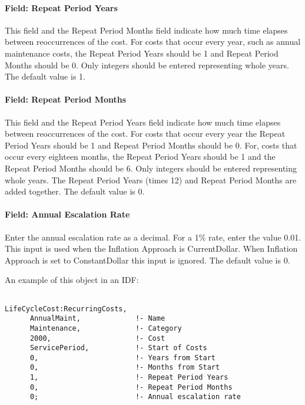 \paragraph{Field: Repeat Period Years}\label{field-repeat-period-years}

This field and the Repeat Period Months field indicate how much time elapses between reoccurrences of the cost. For costs that occur every year, such as annual maintenance costs, the Repeat Period Years should be 1 and Repeat Period Months should be 0. Only integers should be entered representing whole years. The default value is 1.

\paragraph{Field: Repeat Period Months}\label{field-repeat-period-months}

This field and the Repeat Period Years field indicate how much time elapses between reoccurrences of the cost. For costs that occur every year the Repeat Period Years should be 1 and Repeat Period Months should be 0. For, costs that occur every eighteen months, the Repeat Period Years should be 1 and the Repeat Period Months should be 6. Only integers should be entered representing whole years. The Repeat Period Years (times 12) and Repeat Period Months are added together. The default value is 0.

\paragraph{Field: Annual Escalation Rate}\label{field-annual-escalation-rate}

Enter the annual escalation rate as a decimal. For a 1\% rate, enter the value 0.01. This input is used when the Inflation Approach is CurrentDollar. When Inflation Approach is set to ConstantDollar this input is ignored. The default value is 0.

An example of this object in an IDF:

\begin{lstlisting}

LifeCycleCost:RecurringCosts,
      AnnualMaint,             !- Name
      Maintenance,             !- Category
      2000,                    !- Cost
      ServicePeriod,           !- Start of Costs
      0,                       !- Years from Start
      0,                       !- Months from Start
      1,                       !- Repeat Period Years
      0,                       !- Repeat Period Months
      0;                       !- Annual escalation rate
\end{lstlisting}
